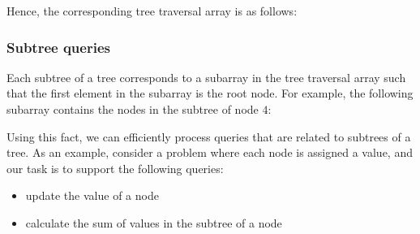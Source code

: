 Hence, the corresponding tree traversal array is as follows:
\begin{center}
\end{center}

\subsubsection{Subtree queries}

Each subtree of a tree corresponds to a subarray
in the tree traversal array such that
the first element in the subarray is the root node.
For example, the following subarray contains the
nodes in the subtree of node $4$:
\begin{center}
\end{center}
Using this fact, we can efficiently process queries
that are related to subtrees of a tree.
As an example, consider a problem where each node
is assigned a value, and our task is to support
the following queries:
\begin{itemize}
\item update the value of a node
\item calculate the sum of values in the subtree of a node
\end{itemize}

